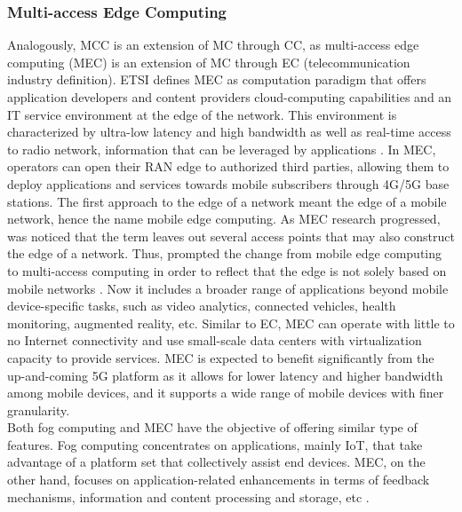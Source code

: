 \subsubsection{Multi-access Edge Computing}
Analogously, MCC is an extension of MC through CC, as multi-access edge computing (MEC) is an extension of MC through EC (telecommunication industry definition). ETSI defines MEC as computation paradigm that offers application developers and content providers cloud-computing capabilities and an IT service environment at the edge of the network. This environment is characterized by ultra-low latency and high bandwidth as well as real-time access to radio network, information that can be leveraged by applications \cite{ETSIMult81:online}. In MEC, operators can open their RAN edge to authorized third parties, allowing them to deploy applications and services towards mobile subscribers through 4G/5G base stations. The first approach to the edge of a network meant the edge of a mobile network, hence the name mobile edge computing. As MEC research progressed, was noticed that the term leaves out several access points that may also construct the edge of a network. Thus, prompted the change from mobile edge computing to multi-access computing in order to reflect that the edge is not solely based on mobile networks \cite{MobileEd74:online}. Now it includes a broader range of applications beyond mobile device-specific tasks, such as video analytics, connected vehicles, health monitoring, augmented reality, etc. Similar to EC, MEC can operate with little to no Internet connectivity and use small-scale data centers with virtualization capacity to provide services. MEC is expected to benefit significantly from the up-and-coming 5G platform as it allows for lower latency and higher bandwidth among mobile devices, and it supports a wide range of mobile devices with finer granularity.\\
\noindent\tab Both fog computing and MEC have the objective of offering similar type of features. Fog computing concentrates on applications, mainly IoT, that take advantage of a platform set that collectively assist end devices. MEC, on the other hand, focuses on application-related enhancements in terms of feedback mechanisms, information and content processing and storage, etc \cite{taleb2017multi}.

